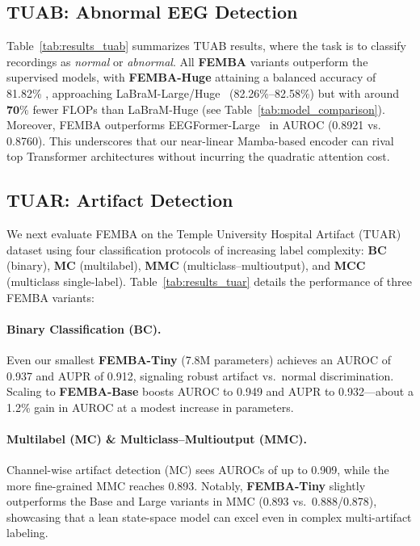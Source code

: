 \subsection{TUAB: Abnormal EEG Detection}
Table~\ref{tab:results_tuab} summarizes TUAB results, where the task is to classify recordings as \emph{normal} or \emph{abnormal}. All \textbf{FEMBA} variants outperform the supervised models, with \textbf{FEMBA-Huge} attaining a balanced accuracy of 81.82\% , approaching LaBraM-Large/Huge~\cite{jianglarge} (82.26\%--82.58\%) but with around \(\mathbf{70\%}\) fewer FLOPs than LaBraM-Huge (see Table~\ref{tab:model_comparison}). Moreover, FEMBA outperforms EEGFormer-Large~\cite{chen2024eegformer} in AUROC (0.8921 vs. 0.8760). This underscores that our near-linear Mamba-based encoder can rival top Transformer architectures without incurring the quadratic attention cost.

\subsection{TUAR: Artifact Detection}
We next evaluate FEMBA on the Temple University Hospital Artifact (TUAR) dataset using four classification protocols of increasing label complexity: \textbf{BC} (binary), \textbf{MC} (multilabel), \textbf{MMC} (multiclass--multioutput), and \textbf{MCC} (multiclass single-label). Table~\ref{tab:results_tuar} details the performance of three FEMBA variants:

\paragraph{Binary Classification (BC).}
Even our smallest \textbf{FEMBA-Tiny} (7.8M parameters) achieves an AUROC of 0.937 and AUPR of 0.912, signaling robust artifact vs.\ normal discrimination. Scaling to \textbf{FEMBA-Base} boosts AUROC to 0.949 and AUPR to 0.932—about a 1.2\% gain in AUROC at a modest increase in parameters.

\paragraph{Multilabel (MC) \& Multiclass–Multioutput (MMC).}
Channel-wise artifact detection (MC) sees AUROCs of up to 0.909, while the more fine-grained MMC reaches 0.893. Notably, \textbf{FEMBA-Tiny} slightly outperforms the Base and Large variants in MMC (0.893 vs.\ 0.888/0.878), showcasing that a lean state-space model can excel even in complex multi-artifact labeling.

